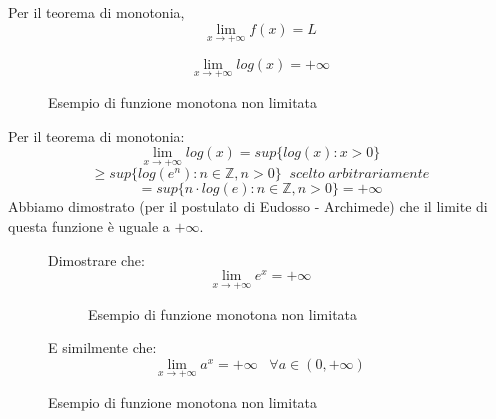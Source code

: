 \documentclass[a4paper]{article}
\theoremstyle{break}
\theoremstyle{break}
\theoremstyle{break}
\theoremstyle{break}
\begin{document}
Per il teorema di monotonia, \[
  \lim_{x \to +\infty} f(x) = L
\]
\begin{example}
  \[
    \lim_{x \to +\infty} log(x) = +\infty
  \]
  \begin{figure}[H]
    \begin{center}
    \end{center}
    \caption{Esempio di funzione monotona non limitata}
  \end{figure}
  Per il teorema di monotonia:
  \[
    \lim_{x \to +\infty} log(x) = sup\{ log(x): x>0 \}
  \]
  \[
    \ge sup\{ log(e^n): n \in \mathbb{Z}, n>0 \}\;\;scelto\;arbitrariamente
  \]
  \[
    = sup\{ n \cdot log(e): n \in \mathbb{Z}, n>0 \} = +\infty
  \]
  Abbiamo dimostrato (per il postulato di Eudosso - Archimede) che il limite di questa
  funzione è uguale a \( +\infty \).
\end{example}
\begin{figure}[H]
  \begin{exercise}
    Dimostrare che:
    \[
      \lim_{x \to +\infty} e^x = +\infty
    \]
    \begin{figure}[H]
      \begin{center}
      \end{center}
      \caption{Esempio di funzione monotona non limitata}
    \end{figure}
    E similmente che:
    \[
      \lim_{x \to +\infty} a^x = +\infty\;\;\;\forall a \in (0,+\infty)
    \]
  \end{exercise}
\end{figure}
\end{document}
